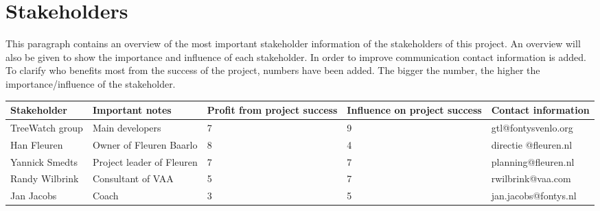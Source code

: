 \section{Stakeholders}

This paragraph contains an overview of the most important stakeholder information of the stakeholders of this project. An overview will also be given to show the importance and influence of each stakeholder. In order to improve communication contact information is added. To clarify who benefits most from the success of the project, numbers have been added. The bigger the number, the higher the importance/influence of the stakeholder.

\begin{tabular}{| p{} | p{3cm} | p{} | p{} | p{} |}
	\hline
	Stakeholder & Important notes & Profit from project success & Influence on project success & Contact information \\
	\hline
	TreeWatch group & Main developers & 7 & 9 & gtl@fontysvenlo.org \\
	\hline
	Han Fleuren & Owner of Fleuren Baarlo & 8 & 4 & directie @fleuren.nl \\
	\hline
	Yannick Smedts & Project leader of Fleuren & 7 & 7 & planning@fleuren.nl \\
	\hline
	Randy Wilbrink & Consultant of VAA & 5 & 7 & rwilbrink@vaa.com \\
	\hline
	Jan Jacobs & Coach & 3 & 5 & jan.jacobs@fontys.nl \\
	\hline
\end{tabular}